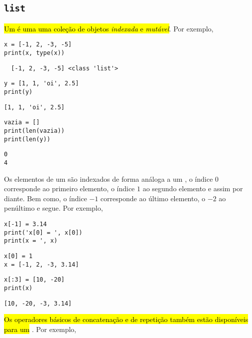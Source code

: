 \documentclass[12pt]{article}
\begin{document}
\subsection{\texttt{list}}

\hl{Um {\PYTHONlist} é uma uma coleção de objetos \emph{indexada} e \emph{mutável}}. Por exemplo,

\begin{lstlisting}
x = [-1, 2, -3, -5]
print(x, type(x))
\end{lstlisting}

\begin{verbatim}
  [-1, 2, -3, -5] <class 'list'>
\end{verbatim}

\begin{lstlisting}
y = [1, 1, 'oi', 2.5]
print(y)
\end{lstlisting}

\begin{verbatim}
[1, 1, 'oi', 2.5]
\end{verbatim}

\begin{lstlisting}
vazia = []
print(len(vazia))
print(len(y))
\end{lstlisting}

\begin{verbatim}
0
4
\end{verbatim}

Os elementos de um {\PYTHONlist} são indexados de forma análoga a um {\PYTHONtuple}, o índice $0$ corresponde ao primeiro elemento, o índice $1$ ao segundo elemento e assim por diante. Bem como, o índice $-1$ corresponde ao último elemento, o $-2$ ao penúltimo e segue. Por exemplo,

\begin{lstlisting}
x[-1] = 3.14
print('x[0] = ', x[0])
print(x = ', x)
\end{lstlisting}

\begin{verbatim}
x[0] = 1
x = [-1, 2, -3, 3.14]
\end{verbatim}

\begin{lstlisting}
x[:3] = [10, -20]
print(x)
\end{lstlisting}

\begin{verbatim}
[10, -20, -3, 3.14]
\end{verbatim}

\hl{Os operadores básicos de concatenação e de repetição também estão disponíveis para um {\PYTHONlist}}. Por exemplo,
\end{document}
